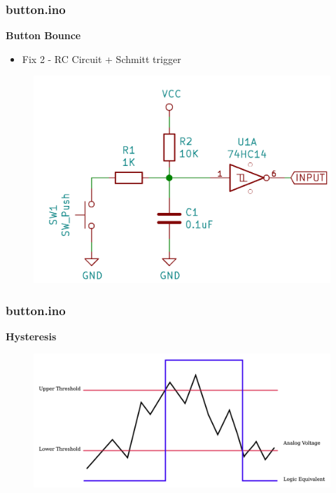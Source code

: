 \documentclass[t]{beamer}
\begin{document}

\begin{frame}[t]
\frametitle{button.ino}
\textbf{Button Bounce}
\begin{itemize}
	\item Fix 2 - RC Circuit + Schmitt trigger
\end{itemize}
\begin{figure}
	\includegraphics[scale=0.3]{schmittSwitch.png}
\end{figure}
\end{frame}


\begin{frame}[t]
\frametitle{button.ino}
\textbf{Hysteresis}
\begin{figure}
	\includegraphics[scale=0.43]{Hysteresis1.png}
\end{figure}
\end{frame}
\end{document}
